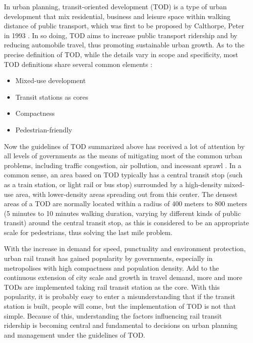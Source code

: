 In urban planning, transit-oriented development (TOD) is a type of urban development that mix residential, business and leisure space within walking distance of public transport, which was first to be proposed by Calthorpe, Peter in 1993 \cite{calthorpe1993next}. In so doing, TOD aims to increase public transport ridership and by reducing automobile travel, thus promoting sustainable urban growth. As to the precise definition of TOD, while the details vary in scope and specificity, most TOD definitions share several common elements \cite{boarnet1997story,bernick1997transit,megally2001california,cervero2004transit}:

\begin{itemize}
	\item Mixed-use development
	\item Transit stations as cores
	\item Compactness
	\item Pedestrian-friendly
\end{itemize}

Now the guidelines of TOD summarized above has received a lot of attention by all levels of governments as the means of mitigating most of the common urban problems, including traffic congestion, air pollution, and incessant sprawl \cite{cervero2002transit}. In a common sense, an area based on TOD typically has a central transit stop (such as a train station, or light rail or bus stop) surrounded by a high-density mixed-use area, with lower-density areas spreading out from this center. The densest areas of a TOD are normally located within a radius of 400 meters to 800 meters (5 minutes to 10 minutes walking duration, varying by different kinds of public transit) around the central transit stop, as this is considered to be an appropriate scale for pedestrians, thus solving the last mile problem. 

With the increase in demand for speed, punctuality and environment protection, urban rail transit has gained popularity by governments, especially in metropolises with high compactness and population density. Add to the continuous extension of city scale and growth in travel demand, more and more TODs are implemented taking rail transit station as the core. With this popularity, it is probably easy to enter a misunderstanding that if the transit station is built, people will come, but the implementation of TOD is not that simple. Because of this, understanding the factors influencing rail transit ridership is becoming central and fundamental to decisions on urban planning and management under the guidelines of TOD. 

